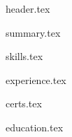 \documentclass[11pt, a4paper]{extarticle}
\begin{document}
	{header.tex}

	{summary.tex}
	
	{skills.tex}

	{experience.tex}
	
	{certs.tex}
	
	{education.tex}
\end{document}

